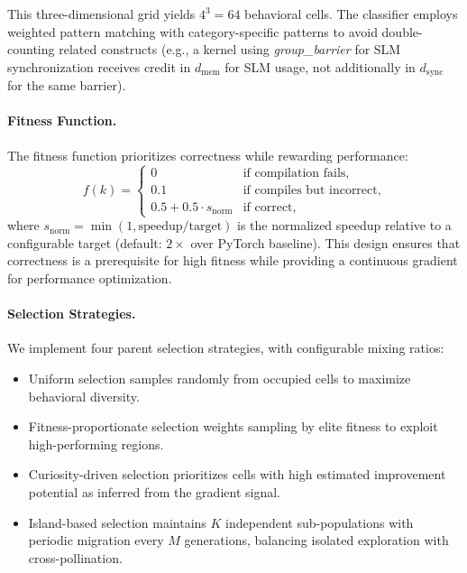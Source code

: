 This three-dimensional grid yields $4^3 = 64$ behavioral cells. 
The classifier employs weighted pattern matching with category-specific patterns to avoid double-counting related constructs (e.g., a kernel using \emph{group\_barrier} for SLM synchronization receives credit in $d_\text{mem}$ for SLM usage, not additionally in $d_\text{sync}$ for the same barrier).


\paragraph{Fitness Function.}
The fitness function prioritizes correctness while rewarding performance:
\begin{equation*}
f(k)=
\begin{cases}
0 & \text{if compilation fails}, \\
0.1 &  \text{if compiles but incorrect}, \\
0.5+0.5 \cdot s_{\text{norm}} &  \text{if correct},
\end{cases}
\end{equation*}
where $s_{\text{norm}} = \min(1, \text{speedup} / \text{target})$ is the normalized speedup relative to a configurable target (default: $2\times$ over PyTorch baseline). This design ensures that correctness is a prerequisite for high fitness while providing a continuous gradient for performance optimization.


\paragraph{Selection Strategies.}
We implement four parent selection strategies, with configurable mixing ratios:
\vspace{-0.5em}
\begin{itemize}[leftmargin=2em,itemsep=0pt]
    \item Uniform selection samples randomly from occupied cells to maximize behavioral diversity. 
    \item Fitness-proportionate selection weights sampling by elite fitness to exploit high-performing regions. 
    \item Curiosity-driven selection prioritizes cells with high estimated improvement potential as inferred from the gradient signal.
    \item Island-based selection maintains $K$ independent sub-populations with periodic migration every $M$ generations, balancing isolated exploration with cross-pollination.
\end{itemize}


